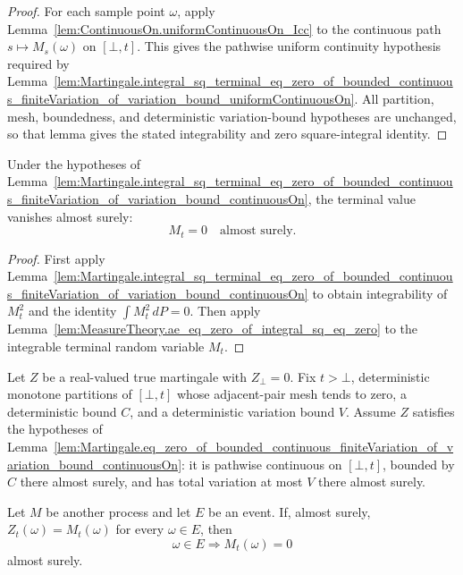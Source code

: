 \begin{proof}
For each sample point \(\omega\), apply
Lemma~\ref{lem:ContinuousOn.uniformContinuousOn_Icc} to the continuous path
\(s\mapsto M_s(\omega)\) on \([\bot,t]\).  This gives the pathwise uniform
continuity hypothesis required by
Lemma~\ref{lem:Martingale.integral_sq_terminal_eq_zero_of_bounded_continuous_finiteVariation_of_variation_bound_uniformContinuousOn}.
All partition, mesh, boundedness, and deterministic variation-bound
hypotheses are unchanged, so that lemma gives the stated integrability and
zero square-integral identity.
\end{proof}

\begin{lemma}\label{lem:Martingale.eq_zero_of_bounded_continuous_finiteVariation_of_variation_bound_continuousOn}
Under the hypotheses of
Lemma~\ref{lem:Martingale.integral_sq_terminal_eq_zero_of_bounded_continuous_finiteVariation_of_variation_bound_continuousOn},
the terminal value vanishes almost surely:
\[
  M_t=0 \quad\text{almost surely.}
\]
\end{lemma}

\begin{proof}
First apply
Lemma~\ref{lem:Martingale.integral_sq_terminal_eq_zero_of_bounded_continuous_finiteVariation_of_variation_bound_continuousOn}
to obtain integrability of \(M_t^2\) and the identity
\(\int M_t^2\,dP=0\).  Then apply
Lemma~\ref{lem:MeasureTheory.ae_eq_zero_of_integral_sq_eq_zero} to the
integrable terminal random variable \(M_t\).
\end{proof}

\begin{lemma}\label{lem:Martingale.eq_zero_on_event_of_bounded_continuous_finiteVariation_of_variation_bound_continuousOn}
Let \(Z\) be a real-valued true martingale with \(Z_\bot=0\).  Fix
\(t>\bot\), deterministic monotone partitions of \([\bot,t]\) whose
adjacent-pair mesh tends to zero, a deterministic bound \(C\), and a
deterministic variation bound \(V\).  Assume \(Z\) satisfies the hypotheses of
Lemma~\ref{lem:Martingale.eq_zero_of_bounded_continuous_finiteVariation_of_variation_bound_continuousOn}:
it is pathwise continuous on \([\bot,t]\), bounded by \(C\) there almost
surely, and has total variation at most \(V\) there almost surely.

Let \(M\) be another process and let \(E\) be an event.  If, almost surely,
\(Z_t(\omega)=M_t(\omega)\) for every \(\omega\in E\), then
\[
  \omega\in E \Longrightarrow M_t(\omega)=0
\]
almost surely.
\end{lemma}

